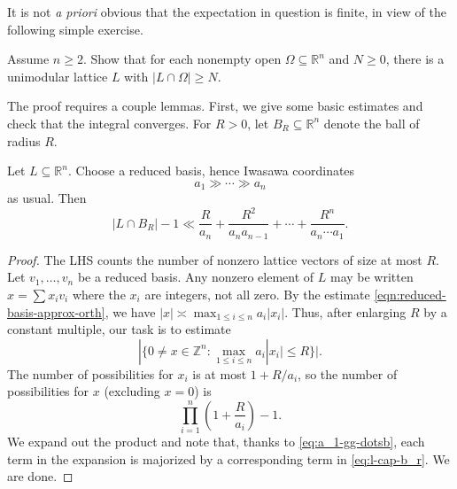 \documentclass[reqno]{amsart} 
\begin{document}
It is not \emph{a priori} obvious that the expectation in question is finite, in view of the following simple exercise.
\begin{exercise}
  Assume $n \geq 2$.  Show that for each nonempty open $\Omega \subseteq \mathbb{R}^n$ and $N \geq 0$, there is a unimodular lattice $L$ with $|L \cap \Omega| \geq N$.
\end{exercise}

The proof requires a couple lemmas.  First, we give some basic estimates and check that the integral converges.  For $R > 0$, let $B_R \subseteq \mathbb{R}^n$ denote the ball of radius $R$.
\begin{lemma}\label{lem:bound-L-cap-B-R-individual}
  Let $L \subseteq \mathbb{R}^n$.  Choose a reduced basis, hence Iwasawa coordinates
  \begin{equation}\label{eq:a_1-gg-dotsb}
    a_1 \gg \dotsb \gg a_n
  \end{equation}
  as usual.  Then
  \begin{equation}\label{eq:l-cap-b_r}
    |L \cap B_R| - 1
    \ll
    \frac{R}{a_n}
    + \frac{R^2}{a_n a_{n-1}} + \dotsb
    + \frac{R^n}{a_n \dotsb a_1}.
  \end{equation}
\end{lemma}
\begin{proof}
  The LHS counts the number of nonzero lattice vectors of size at most $R$.  Let $v_1,\dotsc,v_n$ be a reduced basis.  Any nonzero element of $L$ may be written $x = \sum x_i v_i$ where the $x_i$ are integers, not all zero.  By the estimate \eqref{eqn:reduced-basis-approx-orth}, we have $|x| \asymp \max_{1 \leq i \leq n} a_i |x_i|$.  Thus, after enlarging $R$ by a constant multiple, our task is to estimate
  \begin{equation*}
    | \{ 0 \neq x \in \mathbb{Z}^n : \max_{1 \leq i \leq n} a_i |x_i| \leq R \} |.
  \end{equation*}
  The number of possibilities for $x_i$ is at most $1 + R/a_i$, so the number of possibilities for $x$ (excluding $x = 0$) is
  \begin{equation*}
    \prod_{i=1}^n \left( 1 + \frac{R}{a_i} \right) - 1.
  \end{equation*}
  We expand out the product and note that, thanks to \eqref{eq:a_1-gg-dotsb}, each term in the expansion is majorized by a corresponding term in \eqref{eq:l-cap-b_r}.  We are done.
\end{proof}
\end{document}
